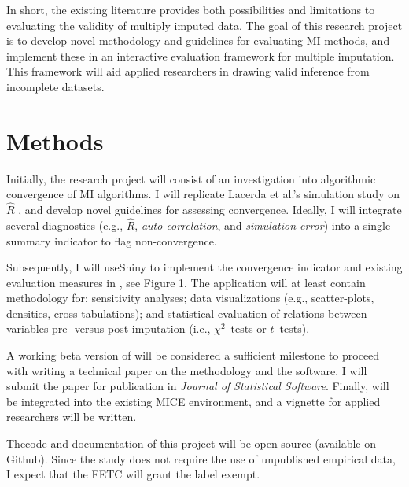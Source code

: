 \documentclass[article]{jss}
\begin{document}
In short, the existing literature provides both possibilities and limitations to evaluating the validity of multiply imputed data. The goal of this research project is to develop novel methodology and guidelines for evaluating MI methods, and implement these in an interactive evaluation framework for multiple imputation. This framework will aid applied researchers in drawing valid inference from incomplete datasets. 




\section{Methods} \label{sec:methods}

Initially, the research project will consist of an investigation into algorithmic convergence of MI algorithms. I will replicate Lacerda et al.'s simulation study on $\widehat{R}$ \citep{lace07}, and develop novel guidelines for assessing convergence. Ideally, I will integrate several diagnostics (e.g., $\widehat{R}$, \emph{auto-correlation}, and \emph{simulation error}) into a single summary indicator to flag non-convergence. 

Subsequently, I will useShiny \citep{shiny} to implement the convergence indicator and existing evaluation measures in , see Figure 1. The application will at least contain methodology for: sensitivity analyses; data visualizations (e.g., scatter-plots, densities, cross-tabulations); and statistical evaluation of relations between variables pre- versus post-imputation (i.e., $\chi^2$~tests or $t$~tests).

A working beta version of  will be considered a sufficient milestone to proceed with writing a technical paper on the methodology and the software. I will submit the paper for publication in \emph{Journal of Statistical Software}. Finally,  will be integrated into the existing MICE environment, and a vignette for applied researchers will be written. 

Thecode and documentation of this project will be open source (available on Github). Since the study does not require the use of unpublished empirical data, I expect that the FETC will grant the label exempt. 

\end{document}
